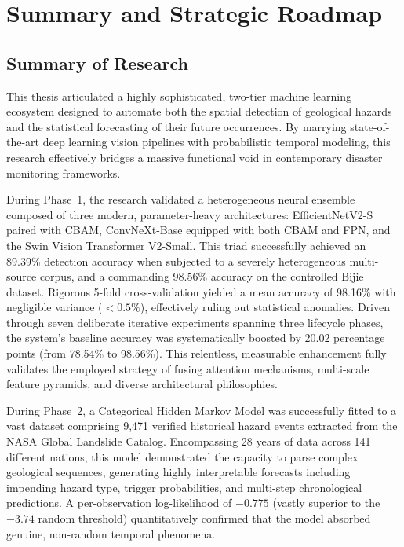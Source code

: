 \documentclass[12pt,a4paper]{report}
\begin{document}
\chapter{Summary and Strategic Roadmap}\label{conclusion}

\section{Summary of Research}
This thesis articulated a highly sophisticated, two-tier machine learning ecosystem designed to automate both the spatial detection of geological hazards and the statistical forecasting of their future occurrences. By marrying state-of-the-art deep learning vision pipelines with probabilistic temporal modeling, this research effectively bridges a massive functional void in contemporary disaster monitoring frameworks.

During Phase~1, the research validated a heterogeneous neural ensemble composed of three modern, parameter-heavy architectures: EfficientNetV2-S paired with CBAM, ConvNeXt-Base equipped with both CBAM and FPN, and the Swin Vision Transformer V2-Small. This triad successfully achieved an 89.39\% detection accuracy when subjected to a severely heterogeneous multi-source corpus, and a commanding 98.56\% accuracy on the controlled Bijie dataset. Rigorous 5-fold cross-validation yielded a mean accuracy of 98.16\% with negligible variance ($< 0.5\%$), effectively ruling out statistical anomalies. Driven through seven deliberate iterative experiments spanning three lifecycle phases, the system's baseline accuracy was systematically boosted by 20.02 percentage points (from 78.54\% to 98.56\%). This relentless, measurable enhancement fully validates the employed strategy of fusing attention mechanisms, multi-scale feature pyramids, and diverse architectural philosophies.

During Phase~2, a Categorical Hidden Markov Model was successfully fitted to a vast dataset comprising 9,471 verified historical hazard events extracted from the NASA Global Landslide Catalog. Encompassing 28 years of data across 141 different nations, this model demonstrated the capacity to parse complex geological sequences, generating highly interpretable forecasts including impending hazard type, trigger probabilities, and multi-step chronological predictions. A per-observation log-likelihood of $-0.775$ (vastly superior to the $-3.74$ random threshold) quantitatively confirmed that the model absorbed genuine, non-random temporal phenomena.
\end{document}
